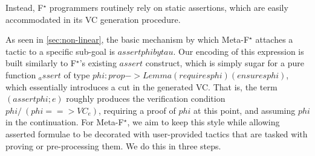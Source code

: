 \documentclass[runningheads]{llncs}
\newcommand\fstar{F$^\star$\xspace}
\newcommand\metafstar{Meta-F$^\star$\xspace}
\newcommand{\comm}[3]{\ifcheckpagebudget\else\ifdraft{{\color{#1}[#2: #3]}}\fi\fi}
\newcommand{\nik}[1]{\comm{dkpurple}{Nik}{#1}}
\newcommand{\ch}[1]{\comm{teal}{CH}{#1}}
\newcommand{\guido}[1]{\comm{blue}{Guido}{#1}}
\newcommand{\da}[1]{\comm{dkyellow}{Danel}{#1}}
\begin{document}
Instead, \fstar programmers routinely rely on static assertions, which
are easily accommodated in its VC generation procedure.
%
\fi

%
As seen in \autoref{sec:non-linear}, the basic mechanism by which
\metafstar attaches a tactic to a specific sub-goal is
\ls$assert phi by tau$. Our encoding of this expression is built
similarly to \fstar's existing \ls$assert$ construct, which is simply
sugar for a pure function \ls$_assert$ of type
\ls$phi:prop -> Lemma (requires phi) (ensures phi)$, which
essentially introduces a cut in the generated VC.
%
That is, the term \ls$(assert phi; e)$ roughly produces the verification condition
\ls$phi /\ (phi ==> VC_e)$, requiring a proof of \ls$phi$ at this point,
and assuming \ls$phi$ in the continuation.
%
For \metafstar, we aim to keep this style while allowing asserted
formulae to be decorated with user-provided tactics that are tasked with
proving or pre-processing them. We do this in three steps.
\end{document}
